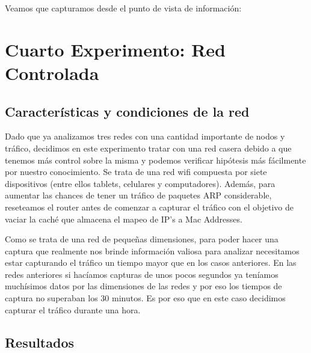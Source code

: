 \documentclass{article}
\theoremstyle{definition}
\theoremstyle{remark}
\begin{document}
Veamos que capturamos desde el punto de vista de información:

\newpage
\section{Cuarto Experimento: Red Controlada}
\subsection{Características y condiciones de la red}
Dado que ya analizamos tres redes con una cantidad importante de nodos y tráfico, decidimos en este experimento tratar con una red casera debido a que tenemos más control sobre la misma y podemos verificar hipótesis más fácilmente por nuestro conocimiento. Se trata de una red wifi compuesta por siete dispositivos (entre ellos tablets, celulares y computadores). Además, para aumentar las chances de tener un tráfico de paquetes ARP considerable, reseteamos el router antes de comenzar a capturar el tráfico con el objetivo de vaciar la caché que almacena el mapeo de IP's a Mac Addresses.
\par Como se trata de una red de pequeñas dimensiones, para poder hacer una captura que realmente nos brinde información valiosa para analizar necesitamos estar capturando el tráfico un tiempo mayor que en los casos anteriores. En las redes anteriores si hacíamos capturas de unos pocos segundos ya teníamos muchísimos datos por las dimensiones de las redes y por eso los tiempos de captura no superaban los 30 minutos. Es por eso que en este caso decidimos capturar el tráfico durante una hora.
\subsection{Resultados}
\end{document}
